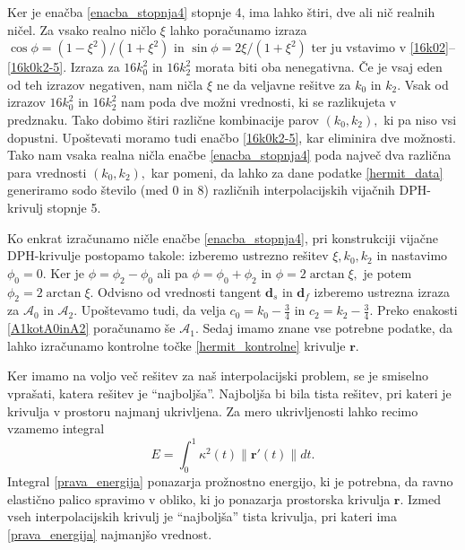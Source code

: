 \documentclass[12pt,a4paper,twoside]{article}
\theoremstyle{definition} %
\theoremstyle{plain} %
\theoremstyle{primerstyle}
\numberwithin{equation}{section}  %
\newcommand{\tV}{\mathbf{t}}
\newcommand{\bV}{\mathbf{b}}
\newcommand{\dV}{\mathbf{d}}
\newcommand{\pV}{\mathbf{p}}
\newcommand{\rV}{\mathbf{r}}
\newcommand{\AQ}{\mathcal{A}}
\begin{document}
Ker je enačba \eqref{enacba_stopnja4} stopnje 4, ima lahko štiri, dve ali nič realnih ničel. Za vsako realno ničlo $\xi$ lahko poračunamo izraza $\cos\phi=(1-\xi^2)/(1+\xi^2)$ in $\sin\phi=2\xi/(1+\xi^2)$ ter ju vstavimo v \eqref{16k02}--\eqref{16k0k2-5}. Izraza za $16k_0^2$ in $16k_2^2$ morata biti oba nenegativna. Če je vsaj eden od teh izrazov negativen, nam ničla $\xi$ ne da veljavne rešitve za $k_0$ in $k_2$. Vsak od izrazov $16k_0^2$ in $16k_2^2$ nam poda dve možni vrednosti, ki se razlikujeta v predznaku. Tako dobimo štiri različne kombinacije parov $(k_0,k_2),$ ki pa niso vsi dopustni. Upoštevati moramo tudi enačbo \eqref{16k0k2-5}, kar eliminira dve možnosti. Tako nam vsaka realna ničla enačbe \eqref{enacba_stopnja4} poda največ dva različna para vrednosti $(k_0,k_2),$ kar pomeni, da lahko za dane podatke \eqref{hermit_data} generiramo sodo število (med 0 in 8) različnih interpolacijskih vijačnih DPH-krivulj stopnje 5. 

Ko enkrat izračunamo ničle enačbe \eqref{enacba_stopnja4}, pri konstrukciji vijačne DPH-krivulje postopamo takole: izberemo ustrezno rešitev $\xi,k_0,k_2$ in nastavimo $\phi_0=0.$ Ker je $\phi=\phi_2-\phi_0$ ali pa $\phi=\phi_0+\phi_2$ in $\phi=2\arctan\xi,$ je potem $\phi_2=2\arctan\xi.$ Odvisno od vrednosti tangent $\dV_s$ in $\dV_f$ izberemo ustrezna izraza za $\AQ_0$ in $\AQ_2.$ Upoštevamo tudi, da velja $c_0=k_0-\frac{3}{4}$ in $c_2=k_2-\frac{3}{4}.$ Preko enakosti \eqref{A1kotA0inA2} poračunamo še $\AQ_1.$ Sedaj imamo znane vse potrebne podatke, da lahko izračunamo kontrolne točke \eqref{hermit_kontrolne} krivulje $\rV$.

Ker imamo na voljo več rešitev za naš interpolacijski problem, se je smiselno vprašati, katera rešitev je ``najboljša''. Najboljša bi bila tista rešitev, pri kateri je krivulja v prostoru najmanj ukrivljena. Za mero ukrivljenosti lahko recimo vzamemo integral
\begin{equation}
	\label{prava_energija}
	E=\int_0^1\kappa^2(t)\lVert\rV'(t)\rVert dt.
\end{equation}
Integral \eqref{prava_energija} ponazarja prožnostno energijo, ki je potrebna, da ravno elastično palico spravimo v obliko, ki jo ponazarja prostorska krivulja $\rV.$ %
Izmed vseh interpolacijskih krivulj je ``najboljša'' tista krivulja, pri kateri ima \eqref{prava_energija} najmanjšo vrednost.
\end{document}
